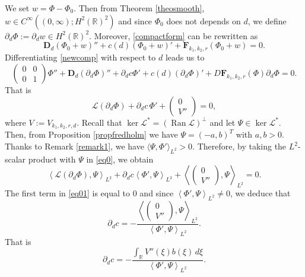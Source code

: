 \documentclass[11pt]{article}
\numberwithin{equation}{section}
\newcommand{\1}{\mathbbm{1}}
\numberwithin{equation}{section}
\theoremstyle{definition}
\def \dis {\displaystyle}
\def \R {\mathbb{R}}
\def \F {\mathbf{F}}
\def \D {\mathbf{D}}
\def \L {\mathcal{L}}
\def \V {\mathcal{V}}
\numberwithin{equation}{section}
\def \dis {\displaystyle}
\begin{document}
We set $w=\Phi-\Phi_0$. Then from Theorem \ref{theosmooth}, $w\in C^\infty((0,\infty);H^2(\R)^2)$ and since $\Phi_0$ does not depends on $d$, we define $\partial_d\Phi:=\partial_dw\in H^2(\R)^2$.  Moreover, \eqref{compactform} can be rewritten as
\begin{equation}\label{newcomp}
	\D_d (\Phi_0+w)''+c(d) (\Phi_0+w)'+\F_{k_1,k_2,r}(\Phi_0+w)=0.
\end{equation}
Differentiating \eqref{newcomp} with respect to $d$ leads us to
\begin{equation*}
	\left(\begin{array}{ll}0 & 0 \\ 0 & 1\end{array}\right)\Phi''+\D_d  (\partial_d\Phi)''+\partial_dc \Phi'+c(d)(\partial_d\Phi)'+D\F_{k_1,k_2,r}(\Phi)\partial_d \Phi=0.
\end{equation*}
That is
\begin{equation}\label{eq0}
	\L(\partial_d \Phi)+\partial_dc \,\Phi'+\begin{pmatrix} 0\\V''\end{pmatrix}=0,
\end{equation}
where $V:=V_{k_1,k_2,r,d}$. Recall that $\operatorname{ker} \L^*=(\operatorname{Ran} \L)^{\perp}$ and let $\Psi\in \operatorname{ker} \L^*$. Then, from Proposition \ref{propfredholm} we have $\Psi=(-a,b)^T$ with $a,b>0$. Thanks to Remark \ref{remark1}, we have $\langle \Psi, \Phi'\rangle_{L^2}>0$. Therefore, by taking the $L^2$-scalar product with $\Psi$ in \eqref{eq0}, we obtain
\begin{equation}\label{eq01}
	\left \langle\L(\partial_d \Phi), \Psi\right\rangle_{L^2}+\partial_dc \left \langle \Phi', \Psi\right\rangle_{L^2}+\left \langle\begin{pmatrix} 0\\V''\end{pmatrix},\Psi\right\rangle_{L^2}=0.
\end{equation}
The first term in \eqref{eq01} is equal to $0$ and since $\left \langle \Phi', \Psi\right\rangle_{L^2}\neq 0$, we deduce that
\begin{equation*}
	\partial_dc =-\frac{\left \langle\begin{pmatrix} 0\\V''\end{pmatrix},\Psi\right\rangle_{L^2}}{\left \langle \Phi', \Psi\right\rangle_{L^2}}.
\end{equation*}
That is 
\begin{equation}\label{eq02}
\dis 	\partial_dc =-\frac{\dis \int_{\R}V''(\xi)b(\xi)\,d\xi}{\left \langle \Phi', \Psi\right\rangle_{L^2}}.
\end{equation}
\end{document}
